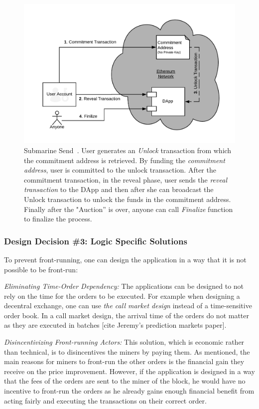 \begin{figure}[h]
\centering
\includegraphics[width=0.5\linewidth]{figures/LibSubmarine.png}
\caption{ Submarine Send~\cite{libsubmarine}. User generates an \textit{Unlock} transaction from which the commitment address is retrieved. By funding the \textit{commitment address}, user is committed to the unlock transaction. After the commitment transaction, in the reveal phase, user sends the \textit{reveal transaction} to the DApp and then after she can broadcast the Unlock transaction to unlock the funds in the commitment address. Finally after the "Auction'' is over, anyone can call \textit{Finalize} function to finalize the process.  \label{fig:LibSubmarine}}
\end{figure}


\subsubsection{Design Decision \#3: Logic Specific Solutions\newline}
To prevent front-running, one can design the application in a way that it is not possible to be front-run:

\noindent\emph{Eliminating Time-Order Dependency:} The applications can be designed to not rely on the time for the orders to be executed. For example when designing a decentral exchange, one can use \emph{the call market design} instead of a time-sensitive order book. In a call market design, the arrival time of the orders do not matter as they are executed in batches [cite Jeremy's prediction markets paper]. 

\noindent\emph{Disincentivizing Front-running Actors:} This solution, which is economic rather than technical, is to disincentives the miners by paying them. As mentioned, the main reasons for miners to front-run the other orders is the financial gain they receive on the price improvement. However, if the application is designed in a way that the fees of the orders are sent to the miner of the block, he would have no incentive to front-run the orders as he already gains enough financial benefit from acting fairly and executing the transactions on their correct order.

